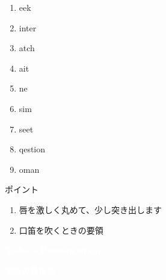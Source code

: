 \documentclass[aspectratio=169,xcolor={dvipsnames,table}]{beamer}
\begin{document}
\begin{frame}[plain]{}

\large

\begin{enumerate}
 \item {}eek
 \item {}inter
 \item {}atch
 \item {}ait
 \item {}ne
 \item sim
 \item seet
 \item qestion
 \item {}oman
\end{enumerate}

\vspace*{10pt}

\small
ポイント

\begin{enumerate}
 \item 唇を激しく丸めて、少し突き出します
 \item 口笛を吹くときの要領
\hfill{\scriptsize {}}

\end{enumerate}
\end{frame}
\begin{frame}
\centering
  \textcolor{white}{\Huge\bfseries Today's Pronunciation}\pause

 \vspace{30pt}

  \textcolor{white}{{\small 単語の最後の}{\Huge\bfseries {}}}

\end{frame}
\end{document}
